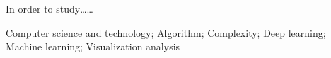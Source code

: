 \vspace*{0mm}

{\let\clearpage\relax \chapter*{\textmd{}\vskip -3bp}}
\setcounter{page}{1}

\setlength{\parskip}{0em}

\textbf{\heiti{}}
In order to study……


\textbf{}
Computer science and technology; Algorithm; Complexity; Deep learning; Machine learning; Visualization analysis
\newpage
